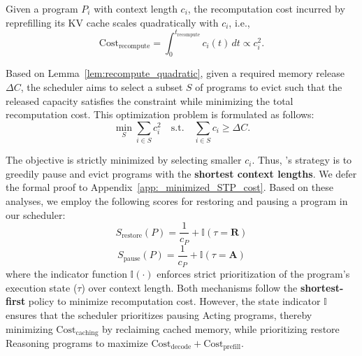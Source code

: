 \begin{lemma}
\label{lem:recompute_quadratic}
Given  a program $P_i$ with context length $c_i$, the recomputation cost incurred by reprefilling its KV cache scales quadratically with $c_i$, i.e.,
\begin{equation}
    \text{Cost}_{\text{recompute}} = \int_{0}^{t_{\mathrm{recompute}}} c_i(t) \, dt \propto c_i^2.
\end{equation}
\end{lemma}

\begin{definition}
\label{def:eviction_problem}
Based on Lemma~\ref{lem:recompute_quadratic}, given a required memory release $\Delta C$, the scheduler aims to
select a subset $S$ of programs to evict such that the released
capacity satisfies the constraint while minimizing the total
recomputation cost. This optimization problem is formulated as follows:
\begin{equation}
\min_{S} \sum_{i \in S} c_i^2
\quad \text{s.t.} \quad
\sum_{i \in S} c_i \ge \Delta C.
\end{equation}
\end{definition}

The objective is strictly minimized by selecting smaller $c_i$.  Thus, \ouralg's strategy is to greedily pause and evict programs with the \textbf{shortest context lengths}. We defer the formal proof to Appendix~\ref{app:_minimized_STP_cost}. Based on these analyses, we employ the following scores for restoring and pausing a program in our scheduler:
\begin{equation}
    S_{\mathrm{restore}}(P) = \frac{1}{c_P} + \mathbb{I}(\tau = \textbf{R})
\end{equation}
\begin{equation}
    S_{\mathrm{pause}}(P) = \frac{1}{c_P} + \mathbb{I}(\tau = \textbf{A})
    \end{equation}
\noindent where the indicator function $\mathbb{I}(\cdot)$ enforces strict prioritization of the program's execution state ($\tau$) over context length. Both mechanisms follow the \textbf{shortest-first} policy to minimize recomputation cost. However, the state indicator $\mathbb{I}$ ensures that the scheduler prioritizes pausing Acting programs, thereby minimizing $\text{Cost}_{\text{caching}}$ by reclaiming cached memory, while prioritizing restore Reasoning programs to maximize $\text{Cost}_{\text{decode}} + \text{Cost}_{\text{prefill}}$.

